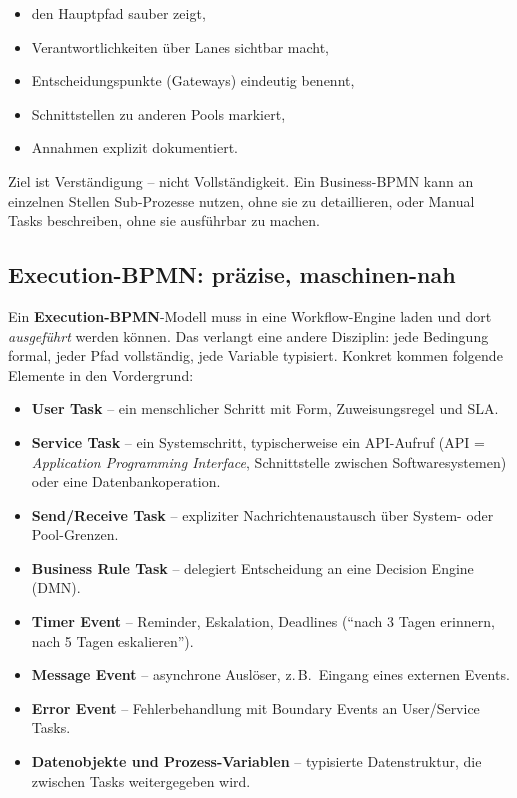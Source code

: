 \documentclass[11pt,a4paper,oneside]{article}
\newcommand{\fachbegriff}[1]{\textbf{#1}}
\begin{document}
\begin{itemize}
  \item den Hauptpfad sauber zeigt,
  \item Verantwortlichkeiten über Lanes sichtbar macht,
  \item Entscheidungspunkte (Gateways) eindeutig benennt,
  \item Schnittstellen zu anderen Pools markiert,
  \item Annahmen explizit dokumentiert.
\end{itemize}

Ziel ist Verständigung -- nicht Vollständigkeit. Ein Business-BPMN kann an einzelnen Stellen Sub-Prozesse nutzen, ohne sie zu detaillieren, oder Manual Tasks beschreiben, ohne sie ausführbar zu machen.

\subsection{Execution-BPMN: präzise, maschinen-nah}

Ein \fachbegriff{Execution-BPMN}-Modell muss in eine Workflow-Engine laden und dort \emph{ausgeführt} werden können. Das verlangt eine andere Disziplin: jede Bedingung formal, jeder Pfad vollständig, jede Variable typisiert. Konkret kommen folgende Elemente in den Vordergrund:

\begin{itemize}
  \item \fachbegriff{User Task} -- ein menschlicher Schritt mit Form, Zuweisungsregel und SLA.
  \item \fachbegriff{Service Task} -- ein Systemschritt, typischerweise ein API-Aufruf (API = \emph{Application Programming Interface}, Schnittstelle zwischen Softwaresystemen) oder eine Datenbankoperation.
  \item \fachbegriff{Send/Receive Task} -- expliziter Nachrichtenaustausch über System- oder Pool-Grenzen.
  \item \fachbegriff{Business Rule Task} -- delegiert Entscheidung an eine Decision Engine (DMN).
  \item \fachbegriff{Timer Event} -- Reminder, Eskalation, Deadlines (``nach 3 Tagen erinnern, nach 5 Tagen eskalieren'').
  \item \fachbegriff{Message Event} -- asynchrone Auslöser, z.\,B.\ Eingang eines externen Events.
  \item \fachbegriff{Error Event} -- Fehlerbehandlung mit Boundary Events an User/Service Tasks.
  \item \fachbegriff{Datenobjekte und Prozess-Variablen} -- typisierte Datenstruktur, die zwischen Tasks weitergegeben wird.
\end{itemize}
\end{document}
